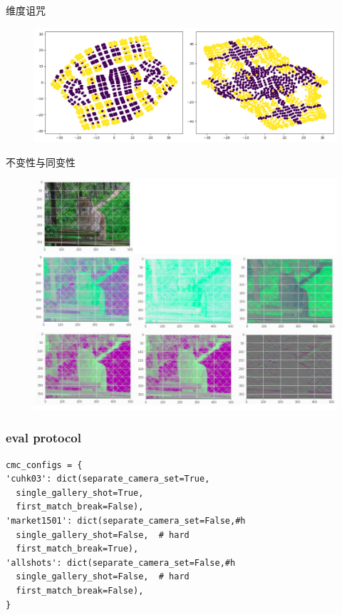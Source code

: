 \documentclass[usenames,dvipsnames,notes]{beamer}
\begin{document}
\begin{frame}{维度诅咒}
\begin{figure}
	\centering
	\includegraphics[width=\textwidth]{dim-curse.png}
\end{figure}
\end{frame}
\begin{frame}{不变性与同变性}
	\begin{figure}
		\centering
		\includegraphics[width=.75\textwidth]{2018-05-21-10-51-51.png}
	\end{figure}
\end{frame}
\begin{frame}[fragile]
	\frametitle{eval protocol}
	\begin{lstlisting}
cmc_configs = {
'cuhk03': dict(separate_camera_set=True,
  single_gallery_shot=True,
  first_match_break=False),
'market1501': dict(separate_camera_set=False,#h
  single_gallery_shot=False,  # hard
  first_match_break=True),
'allshots': dict(separate_camera_set=False,#h
  single_gallery_shot=False,  # hard
  first_match_break=False),
}
\end{lstlisting}
\end{frame}
\end{document}
